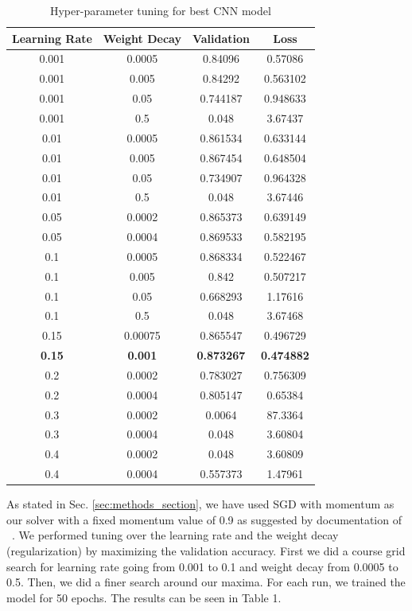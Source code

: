 \documentclass[10pt,twocolumn,letterpaper]{article}
\begin{document}
\begin{table}
\begin{center}
\label{CNN_tuning}
\begin{tabular}{|c|c|c|c|}
\hline
Learning Rate & Weight Decay & Validation & Loss\\
\hline\hline
0.001 & 0.0005 & 0.84096 & 0.57086\\
0.001 & 0.005 & 0.84292 & 0.563102\\
0.001 & 0.05 & 0.744187 & 0.948633\\
0.001 & 0.5 & 0.048 & 3.67437\\
0.01 & 0.0005 & 0.861534 & 0.633144\\
0.01 & 0.005 & 0.867454 & 0.648504\\
0.01 & 0.05 & 0.734907 & 0.964328\\
0.01 & 0.5 & 0.048 & 3.67446\\
0.05 & 0.0002 & 0.865373 & 0.639149\\
0.05 & 0.0004 & 0.869533 & 0.582195\\
0.1 & 0.0005 & 0.868334 & 0.522467\\
0.1 & 0.005 & 0.842 & 0.507217\\
0.1 & 0.05 & 0.668293 & 1.17616\\
0.1 & 0.5 & 0.048 & 3.67468\\
0.15 & 0.00075 & 0.865547 & 0.496729\\
\textbf{0.15} & \textbf{0.001} & \textbf{0.873267} & \textbf{0.474882}\\
0.2 & 0.0002 & 0.783027 & 0.756309\\
0.2 & 0.0004 & 0.805147 & 0.65384\\
0.3 & 0.0002 & 0.0064 & 87.3364\\
0.3 & 0.0004 & 0.048 & 3.60804\\
0.4 & 0.0002 & 0.048 & 3.60809\\
0.4 & 0.0004 & 0.557373 & 1.47961\\
\hline
\end{tabular}
\end{center}
\caption{Hyper-parameter tuning for best CNN model}
\end{table}

As stated in Sec. \ref{sec:methods_section}, we have used SGD with momentum as our solver with a fixed momentum value of 0.9 as suggested by documentation of ~\cite{jia2014caffe}. We performed tuning over the learning rate and the weight decay (regularization) by maximizing the validation accuracy. First we did a course grid search for learning rate going from 0.001 to 0.1 and weight decay from 0.0005 to 0.5. Then, we did a finer search around our maxima. For each run, we trained the model for 50 epochs. The results can be seen in Table 1.  
\end{document}
